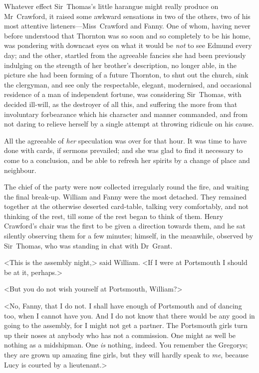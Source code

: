Whatever effect Sir~Thomas's little harangue might really produce on Mr~Crawford, it raised some awkward sensations in two of the others, two of his most attentive listeners—Miss~Crawford and Fanny. One of whom, having never before understood that Thornton was so soon and so completely to be his home, was pondering with downcast eyes on what it would be \textit{not}  to see Edmund every day; and the other, startled from the agreeable fancies she had been previously indulging on the strength of her brother's description, no longer able, in the picture she had been forming of a future Thornton, to shut out the church, sink the clergyman, and see only the respectable, elegant, modernised, and occasional residence of a man of independent fortune, was considering Sir~Thomas, with decided ill-will, as the destroyer of all this, and suffering the more from that involuntary forbearance which his character and manner commanded, and from not daring to relieve herself by a single attempt at throwing ridicule on his cause.

All the agreeable of \textit{her}  speculation was over for that hour. It was time to have done with cards, if sermons prevailed; and she was glad to find it necessary to come to a conclusion, and be able to refresh her spirits by a change of place and neighbour.

The chief of the party were now collected irregularly round the fire, and waiting the final break-up. William and Fanny were the most detached. They remained together at the otherwise deserted card-table, talking very comfortably, and not thinking of the rest, till some of the rest began to think of them. Henry Crawford's chair was the first to be given a direction towards them, and he sat silently observing them for a few minutes; himself, in the meanwhile, observed by Sir~Thomas, who was standing in chat with Dr~Grant.

<This is the assembly night,> said William. <If I were at Portsmouth I should be at it, perhaps.>

<But you do not wish yourself at Portsmouth, William?>

<No, Fanny, that I do not. I shall have enough of Portsmouth and of dancing too, when I cannot have you. And I do not know that there would be any good in going to the assembly, for I might not get a partner. The Portsmouth girls turn up their noses at anybody who has not a commission. One might as well be nothing as a midshipman. One \textit{is}  nothing, indeed. You remember the Gregorys; they are grown up amazing fine girls, but they will hardly speak to \textit{me}, because Lucy is courted by a lieutenant.>

